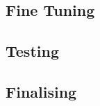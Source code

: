 \documentclass[a4paper, 10pt]{article}
\begin{document}

\subsection{Fine Tuning} 



\subsection{Testing}

%
%


\subsection{Finalising}

%

\clearpage
\end{document}
